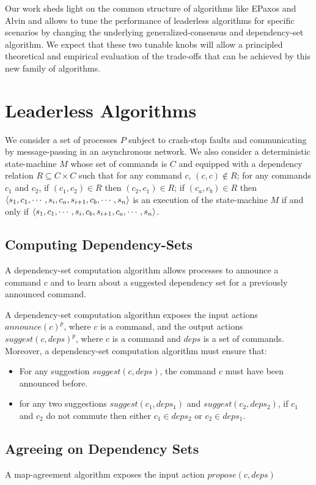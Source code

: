 Our work sheds light on the common structure of algorithms like EPaxos and Alvin and allows to tune the performance of leaderless algorithms for specific scenarios by changing the underlying generalized-consensus and dependency-set algorithm. 
We expect that these two tunable knobs will allow a principled theoretical and empirical evaluation of the trade-offs that can be achieved by this new family of algorithms.

\section{Leaderless Algorithms}

We consider a set of processes $P$ subject to crash-stop faults and communicating by message-passing in an asynchronous network.
We also consider a deterministic state-machine $M$ whose set of commands is $C$ and equipped with a dependency relation $R \subseteq C\times C$ such that for any command $c$, $\left( c,c \right)\notin R$; for any commands $c_1$ and $c_2$, if $\left( c_1,c_2 \right)\in R$ then $\left( c_2,c_1 \right)\in R$; if $\left( c_a,c_b \right)\in R$ then $\left\langle s_1,c_1,\cdots,s_i,c_a,s_{i+1},c_b,\cdots,s_n\right\rangle$ is an execution of the state-machine $M$ if and only if
$\left\langle s_1,c_1,\cdots,s_i,c_b,s_{i+1},c_a,\cdots,s_n\right\rangle$.

\subsection{Computing Dependency-Sets}

A dependency-set computation algorithm allows processes to announce a command $c$ and to learn about a suggested dependency set for a previously announced command.

A dependency-set computation algorithm exposes the input actions ${announce\left( c \right)}^p$, where $c$ is a command, and the output actions ${suggest\left( c, deps \right)}^p$, where $c$ is a command and $deps$ is a set of commands.
Moreover, a dependency-set computation algorithm must ensure that:
\begin{itemize}[noitemsep,nolistsep]
    \item For any suggestion ${suggest\left( c, deps \right)}$, the command $c$ must have been announced before.
    \item for any two suggestions $suggest\left( c_1, deps_1 \right)$ and $suggest\left( c_2, deps_2 \right)$,  if $c_1$ and $c_2$ do not commute then either $c_1\in deps_2$ or $c_2 \in deps_1$.
\end{itemize}

\subsection{Agreeing on Dependency Sets}

A map-agreement algorithm exposes the input action $propose\left( c, deps \right)$

{}



